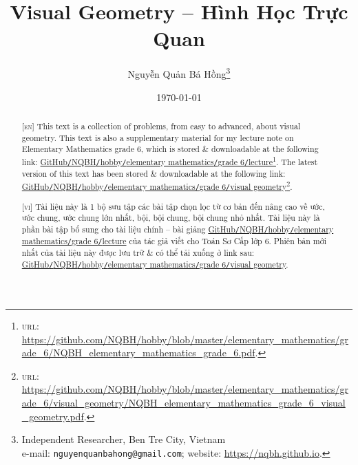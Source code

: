 \documentclass{article}
\title{Visual Geometry -- Hình Học Trực Quan}
\author{Nguyễn Quản Bá Hồng\footnote{Independent Researcher, Ben Tre City, Vietnam\\e-mail: \texttt{nguyenquanbahong@gmail.com}; website: \url{https://nqbh.github.io}.}}
\date{\today}
\numberwithin{equation}{section}
\begin{document}
\maketitle
\begin{abstract}
	\textsc{[en]} This text is a collection of problems, from easy to advanced, about visual geometry. This text is also a supplementary material for my lecture note on Elementary Mathematics grade 6, which is stored \& downloadable at the following link: \href{https://github.com/NQBH/hobby/blob/master/elementary_mathematics/grade_6/NQBH_elementary_mathematics_grade_6.pdf}{GitHub\texttt{/}NQBH\texttt{/}hobby\texttt{/}elementary mathematics\texttt{/}grade 6\texttt{/}lecture}\footnote{\textsc{url}: \url{https://github.com/NQBH/hobby/blob/master/elementary_mathematics/grade_6/NQBH_elementary_mathematics_grade_6.pdf}.}. The latest version of this text has been stored \& downloadable at the following link: \href{https://github.com/NQBH/hobby/blob/master/elementary_mathematics/grade_6/visual_geometry/NQBH_elementary_mathematics_grade_6_visual_geometry.pdf}{GitHub\texttt{/}NQBH\texttt{/}hobby\texttt{/}elementary mathematics\texttt{/}grade 6\texttt{/}visual geometry}\footnote{\textsc{url}: \url{https://github.com/NQBH/hobby/blob/master/elementary_mathematics/grade_6/visual_geometry/NQBH_elementary_mathematics_grade_6_visual_geometry.pdf}.}.
	\vspace{2mm}
	
	\textsc{[vi]} Tài liệu này là 1 bộ sưu tập các bài tập chọn lọc từ cơ bản đến nâng cao về ước, ước chung, ước chung lớn nhất, bội, bội chung, bội chung nhỏ nhất. Tài liệu này là phần bài tập bổ sung cho tài liệu chính -- bài giảng \href{https://github.com/NQBH/hobby/blob/master/elementary_mathematics/grade_6/NQBH_elementary_mathematics_grade_6.pdf}{GitHub\texttt{/}NQBH\texttt{/}hobby\texttt{/}elementary mathematics\texttt{/}grade 6\texttt{/}lecture} của tác giả viết cho Toán Sơ Cấp lớp 6. Phiên bản mới nhất của tài liệu này được lưu trữ \& có thể tải xuống ở link sau: \href{https://github.com/NQBH/hobby/blob/master/elementary_mathematics/grade_6/visual_geometry/NQBH_elementary_mathematics_grade_6_visual_geometry.pdf}{GitHub\texttt{/}NQBH\texttt{/}hobby\texttt{/}elementary mathematics\texttt{/}grade 6\texttt{/}visual geometry}.
\end{abstract}
\setcounter{secnumdepth}{4}
\setcounter{tocdepth}{3}
\tableofcontents

\end{document}
